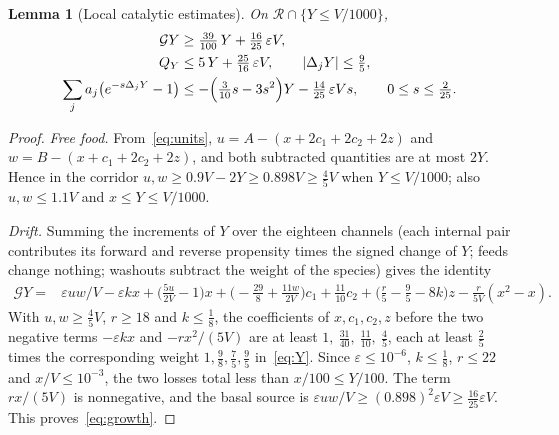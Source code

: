 \documentclass[11pt,a4paper]{article}
\theoremstyle{plain}
\newtheorem{lemma}[theorem]{Lemma}
\theoremstyle{definition}
\theoremstyle{remark}
\newcommand{\G}{\mathcal G}
\newcommand{\R}{\mathcal R}
\newcommand{\eps}{\varepsilon}
\begin{document}
\begin{lemma}[Local catalytic estimates]\label{lem:local}
On $\R\cap\{Y\le V/1000\}$,
\begin{align}
\G Y&\ge\tfrac{39}{100}\,Y+\tfrac{16}{25}\,\eps V,\label{eq:growth}\\
Q_Y&\le 5\,Y+\tfrac{25}{16}\,\eps V,\qquad |\Delta_jY|\le\tfrac95,\label{eq:variance}\\
\sum_j a_j\bigl(e^{-s\Delta_jY}-1\bigr)&\le-\Bigl(\tfrac3{10}s-3s^2\Bigr)Y-\tfrac{14}{25}\,\eps V s,\qquad 0\le s\le\tfrac2{25}.\label{eq:entry-tilt}
\end{align}
\end{lemma}
\begin{proof}
\emph{Free food.} From~\eqref{eq:units}, $u=A-(x+2c_1+2c_2+2z)$ and $w=B-(x+c_1+2c_2+2z)$, and both subtracted quantities are at most $2Y$. Hence in the corridor $u,w\ge0.9V-2Y\ge0.898V\ge\frac45V$ when $Y\le V/1000$; also $u,w\le1.1V$ and $x\le Y\le V/1000$.

\emph{Drift.} Summing the increments of $Y$ over the eighteen channels (each internal pair contributes its forward and reverse propensity times the signed change of $Y$; feeds change nothing; washouts subtract the weight of the species) gives the identity
\begin{align*}
\G Y={}&\eps uw/V-\eps kx+\bigl(\tfrac{5u}{2V}-1\bigr)x+\bigl(-\tfrac{29}8+\tfrac{11w}{2V}\bigr)c_1+\tfrac{11}{10}c_2+\bigl(\tfrac r5-\tfrac95-8k\bigr)z-\tfrac r{5V}(x^2-x).
\end{align*}
With $u,w\ge\frac45V$, $r\ge18$ and $k\le\frac18$, the coefficients of $x,c_1,c_2,z$ before the two negative terms $-\eps kx$ and $-rx^2/(5V)$ are at least $1,\ \frac{31}{40},\ \frac{11}{10},\ \frac45$, each at least $\frac25$ times the corresponding weight $1,\frac98,\frac75,\frac95$ in~\eqref{eq:Y}. Since $\eps\le10^{-6}$, $k\le\frac18$, $r\le22$ and $x/V\le10^{-3}$, the two losses total less than $x/100\le Y/100$. The term $rx/(5V)$ is nonnegative, and the basal source is $\eps uw/V\ge(0.898)^2\eps V\ge\frac{16}{25}\eps V$. This proves~\eqref{eq:growth}.


\end{proof}
\end{document}
